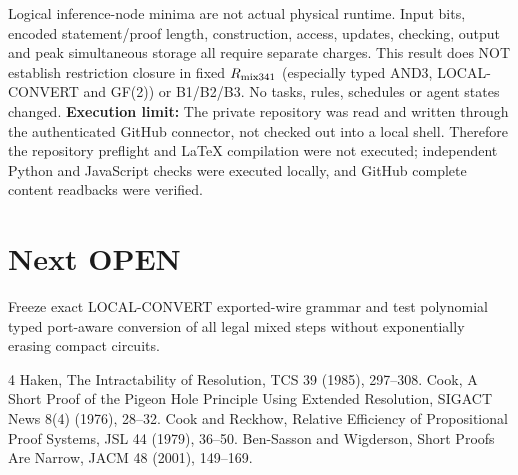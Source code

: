 \documentclass{article}
\begin{document}
Logical inference-node minima are not actual physical runtime. Input bits, encoded statement/proof length, construction, access, updates, checking, output and peak simultaneous storage all require separate charges. This result does NOT establish restriction closure in fixed $R_{\rm mix341}$ (especially typed AND3, LOCAL-CONVERT and GF(2)) or B1/B2/B3. No tasks, rules, schedules or agent states changed.
\noindent\textbf{Execution limit:} The private repository was read and written through the authenticated GitHub connector, not checked out into a local shell. Therefore the repository preflight and LaTeX compilation were not executed; independent Python and JavaScript checks were executed locally, and GitHub complete content readbacks were verified.\par
\section*{Next OPEN}
Freeze exact LOCAL-CONVERT exported-wire grammar and test polynomial typed port-aware conversion of all legal mixed steps without exponentially erasing compact circuits.
\begin{thebibliography}{4}
 Haken, The Intractability of Resolution, TCS 39 (1985), 297--308.
 Cook, A Short Proof of the Pigeon Hole Principle Using Extended Resolution, SIGACT News 8(4) (1976), 28--32.
 Cook and Reckhow, Relative Efficiency of Propositional Proof Systems, JSL 44 (1979), 36--50.
 Ben-Sasson and Wigderson, Short Proofs Are Narrow, JACM 48 (2001), 149--169.
\end{thebibliography}
\end{document}
